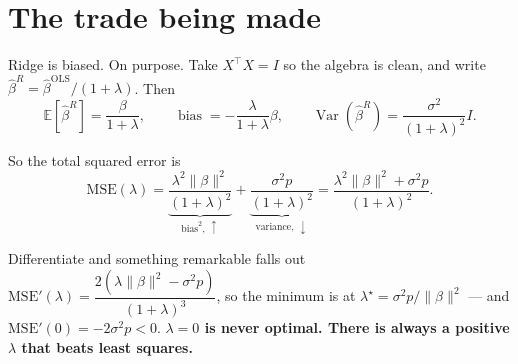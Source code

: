\documentclass[aspectratio=169]{beamer}
\begin{document}
\section[Bias--variance]{The trade being made}
\label{sec:bv}

\begin{frame}[shrink=6]{Ridge is biased. On purpose.}
  Take $X^{\!\top}\!X = I$ so the algebra is clean, and write
  $\hat\beta^{R} = \hat\beta^{\mathrm{OLS}}/(1+\lambda)$. Then
  \[
    \mathbb{E}[\hat\beta^{R}] = \frac{\beta}{1+\lambda},
    \qquad
    \operatorname{bias} = -\frac{\lambda}{1+\lambda}\beta,
    \qquad
    \operatorname{Var}(\hat\beta^{R}) = \frac{\sigma^2}{(1+\lambda)^2} I .
  \]
  \begin{block}{So the total squared error is}
    \[
      \mathrm{MSE}(\lambda)
      = \underbrace{\frac{\lambda^2 \|\beta\|^2}{(1+\lambda)^2}}_{\text{bias}^2,\ \uparrow}
      + \underbrace{\frac{\sigma^2 p}{(1+\lambda)^2}}_{\text{variance},\ \downarrow}
      = \frac{\lambda^2\|\beta\|^2 + \sigma^2 p}{(1+\lambda)^2} .
    \]
  \end{block}
  \begin{alertblock}{Differentiate and something remarkable falls out}
    \small
    $\mathrm{MSE}'(\lambda) = \dfrac{2(\lambda\|\beta\|^2 - \sigma^2p)}{(1+\lambda)^3}$,
    so the minimum is at
    $\boxed{\lambda^\star = \sigma^2 p / \|\beta\|^2}$ --- and
    $\mathrm{MSE}'(0) = -2\sigma^2 p < 0$. \textbf{$\lambda = 0$ is never
    optimal. There is always a positive $\lambda$ that beats least squares.}
  \end{alertblock}
\end{frame}
\end{document}

